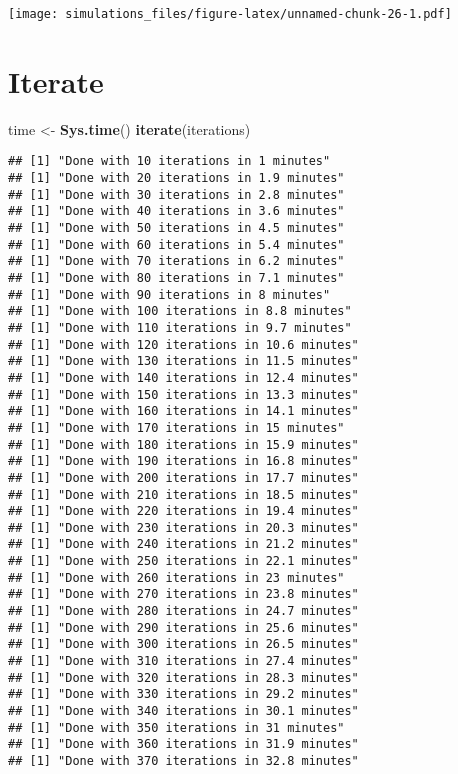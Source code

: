 \documentclass[]{article}
\newenvironment{Shaded}{\begin{snugshade}}{\end{snugshade}}
\newcommand{\KeywordTok}[1]{\textcolor[rgb]{0.13,0.29,0.53}{\textbf{#1}}}
\newcommand{\StringTok}[1]{\textcolor[rgb]{0.31,0.60,0.02}{#1}}
\newcommand{\NormalTok}[1]{#1}
\begin{document}
\texttt{[image: simulations\_files/figure-latex/unnamed-chunk-26-1.pdf]}

\section{Iterate}\label{iterate}

\begin{Shaded}
\begin{Highlighting}[]
\NormalTok{time <-}\StringTok{ }\KeywordTok{Sys.time}\NormalTok{()}
\KeywordTok{iterate}\NormalTok{(iterations)}
\end{Highlighting}
\end{Shaded}

\begin{verbatim}
## [1] "Done with 10 iterations in 1 minutes"
## [1] "Done with 20 iterations in 1.9 minutes"
## [1] "Done with 30 iterations in 2.8 minutes"
## [1] "Done with 40 iterations in 3.6 minutes"
## [1] "Done with 50 iterations in 4.5 minutes"
## [1] "Done with 60 iterations in 5.4 minutes"
## [1] "Done with 70 iterations in 6.2 minutes"
## [1] "Done with 80 iterations in 7.1 minutes"
## [1] "Done with 90 iterations in 8 minutes"
## [1] "Done with 100 iterations in 8.8 minutes"
## [1] "Done with 110 iterations in 9.7 minutes"
## [1] "Done with 120 iterations in 10.6 minutes"
## [1] "Done with 130 iterations in 11.5 minutes"
## [1] "Done with 140 iterations in 12.4 minutes"
## [1] "Done with 150 iterations in 13.3 minutes"
## [1] "Done with 160 iterations in 14.1 minutes"
## [1] "Done with 170 iterations in 15 minutes"
## [1] "Done with 180 iterations in 15.9 minutes"
## [1] "Done with 190 iterations in 16.8 minutes"
## [1] "Done with 200 iterations in 17.7 minutes"
## [1] "Done with 210 iterations in 18.5 minutes"
## [1] "Done with 220 iterations in 19.4 minutes"
## [1] "Done with 230 iterations in 20.3 minutes"
## [1] "Done with 240 iterations in 21.2 minutes"
## [1] "Done with 250 iterations in 22.1 minutes"
## [1] "Done with 260 iterations in 23 minutes"
## [1] "Done with 270 iterations in 23.8 minutes"
## [1] "Done with 280 iterations in 24.7 minutes"
## [1] "Done with 290 iterations in 25.6 minutes"
## [1] "Done with 300 iterations in 26.5 minutes"
## [1] "Done with 310 iterations in 27.4 minutes"
## [1] "Done with 320 iterations in 28.3 minutes"
## [1] "Done with 330 iterations in 29.2 minutes"
## [1] "Done with 340 iterations in 30.1 minutes"
## [1] "Done with 350 iterations in 31 minutes"
## [1] "Done with 360 iterations in 31.9 minutes"
## [1] "Done with 370 iterations in 32.8 minutes"

\end{verbatim}
\end{document}
